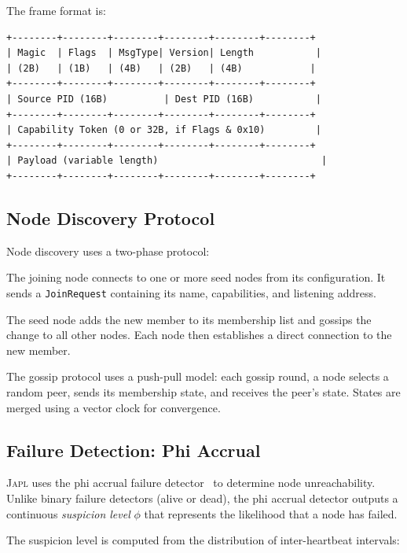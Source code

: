 \documentclass[11pt,a4paper]{article}
\newcommand{\japl}{\textsc{Japl}}
\begin{document}
The frame format is:

\begin{verbatim}
+--------+--------+--------+--------+--------+--------+
| Magic  | Flags  | MsgType| Version| Length           |
| (2B)   | (1B)   | (4B)   | (2B)   | (4B)            |
+--------+--------+--------+--------+--------+--------+
| Source PID (16B)          | Dest PID (16B)           |
+--------+--------+--------+--------+--------+--------+
| Capability Token (0 or 32B, if Flags & 0x10)         |
+--------+--------+--------+--------+--------+--------+
| Payload (variable length)                             |
+--------+--------+--------+--------+--------+--------+
\end{verbatim}

\subsection{Node Discovery Protocol}

Node discovery uses a two-phase protocol:

\begin{description}[nosep]
  \item[Phase 1: Seed contact.] The joining node connects to one or more
    seed nodes from its configuration. It sends a \texttt{JoinRequest}
    containing its name, capabilities, and listening address.
  \item[Phase 2: Gossip dissemination.] The seed node adds the new member
    to its membership list and gossips the change to all other nodes.
    Each node then establishes a direct connection to the new member.
\end{description}

The gossip protocol uses a push-pull model: each gossip round, a node
selects a random peer, sends its membership state, and receives the
peer's state. States are merged using a vector clock for convergence.

\subsection{Failure Detection: Phi Accrual}

\japl{} uses the phi accrual failure detector~\citep{hayashibara2004phi}
to determine node unreachability. Unlike binary failure detectors (alive
or dead), the phi accrual detector outputs a continuous \emph{suspicion
level} $\phi$ that represents the likelihood that a node has failed.

The suspicion level is computed from the distribution of inter-heartbeat
intervals:
\end{document}
